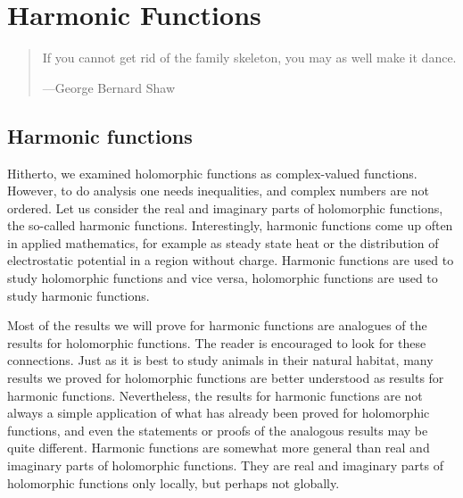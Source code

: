 \documentclass[12pt,openany]{book}
\theoremstyle{plain}
\theoremstyle{remark}
\theoremstyle{definition}
\newenvironment{myepigraph}{%
    \begin{quote}%
    \begingroup\itshape
}{%
    \endgroup%
    \end{quote}
}
\theoremstyle{exercise}
\theoremstyle{example}
\begin{document}

\chapter{Harmonic Functions} \label{ch:harmonic}

\begin{myepigraph}
If you cannot get rid of the family skeleton, you may as well make it
dance.

---George Bernard Shaw
\end{myepigraph}


\section{Harmonic functions}
\label{sec:harmonic}

Hitherto, we examined holomorphic functions as complex-valued functions.
However, to do analysis one needs inequalities, and complex numbers are not
ordered.  Let us consider the real and imaginary parts of holomorphic
functions, the so-called harmonic functions.  Interestingly, harmonic
functions come up often in applied mathematics, for example as steady state
heat or the distribution of electrostatic potential in a region without
charge.  Harmonic functions are used to study
holomorphic functions and vice versa, holomorphic functions are used to
study harmonic functions.

Most of the results
we will prove for harmonic functions are analogues of the results 
for holomorphic functions.  The reader is
encouraged to look for these connections.
Just as it is best to study animals in their natural habitat,
many results we proved for holomorphic functions are
better understood as results for harmonic functions.
Nevertheless, the results for harmonic functions are not
always a simple application of what has already been proved for holomorphic
functions, and even the
statements or proofs of the analogous results may be quite different.
Harmonic functions are somewhat more general than real and
imaginary parts of holomorphic functions.  They are real and imaginary parts
of holomorphic functions only locally, but perhaps not globally.
\end{document}
